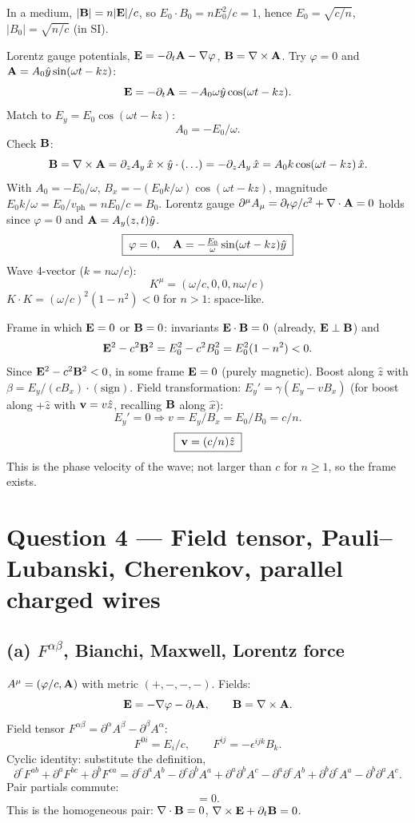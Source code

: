 \documentclass[11pt]{article}
\begin{document}
In a medium, $|\vb B| = n|\vb E|/c$, so $E_0\cdot B_0 = n E_0^2/c = 1$, hence $E_0 = \sqrt{c/n}$, $|B_0| = \sqrt{n/c}$ (in SI).

Lorentz gauge potentials, $\vb E = -\partial_t\vb A - \nabla\varphi$, $\vb B = \nabla\times\vb A$. Try $\varphi=0$ and $\vb A = A_0\hat y\sin(\omega t - kz)$:
\[ \vb E = -\partial_t\vb A = -A_0\omega\hat y\cos(\omega t - kz). \]
Match to $E_y = E_0\cos(\omega t-kz)$:
\[ A_0 = -E_0/\omega. \]
Check $\vb B$:
\[ \vb B = \nabla\times\vb A = \partial_z A_y\,\hat x \times\hat y\cdot(\ldots) = -\partial_z A_y\,\hat x = A_0 k\cos(\omega t - kz)\,\hat x. \]
With $A_0 = -E_0/\omega$, $B_x = -(E_0 k/\omega)\cos(\omega t - kz)$, magnitude $E_0 k/\omega = E_0/v_\text{ph} = n E_0/c = B_0$. Lorentz gauge $\partial^\mu A_\mu = \partial_t\varphi/c^2 + \nabla\cdot\vb A = 0$ holds since $\varphi=0$ and $\vb A = A_y(z,t)\hat y$.
\[ \boxed{\;\varphi = 0,\quad \vb A = -\tfrac{E_0}{\omega}\sin(\omega t - kz)\hat y\;} \]
Wave 4-vector ($k = n\omega/c$):
\[ \boxed{\;K^\mu = (\omega/c, 0, 0, n\omega/c)\;} \]
$K\cdot K = (\omega/c)^2(1 - n^2) < 0$ for $n>1$: space-like.

Frame in which $\vb E = 0$ or $\vb B = 0$: invariants $\vb E\cdot\vb B = 0$ (already, $\vb E\perp\vb B$) and
\[ \vb E^2 - c^2\vb B^2 = E_0^2 - c^2 B_0^2 = E_0^2(1 - n^2) < 0. \]
Since $\vb E^2 - c^2\vb B^2 < 0$, in some frame $\vb E = 0$ (purely magnetic). Boost along $\hat z$ with $\beta = E_y/(c B_x)\cdot(\text{sign})$. Field transformation: $E_y' = \gamma(E_y - v B_x)$ (for boost along $+\hat z$ with $\vb v = v\hat z$, recalling $\vb B$ along $\hat x$):
\[ E_y' = 0\Rightarrow v = E_y/B_x = E_0/B_0 = c/n. \]
\[ \boxed{\;\vb v = (c/n)\hat z\;} \]
This is the phase velocity of the wave; not larger than $c$ for $n\ge 1$, so the frame exists.

\section*{Question 4 --- Field tensor, Pauli--Lubanski, Cherenkov, parallel charged wires}

\subsection*{(a) $F^{\alpha\beta}$, Bianchi, Maxwell, Lorentz force}

$A^\mu = (\varphi/c,\vb A)$ with metric $(+,-,-,-)$. Fields:
\[ \vb E = -\nabla\varphi - \partial_t\vb A, \qquad \vb B = \nabla\times\vb A. \]
Field tensor $F^{\alpha\beta} = \partial^\alpha A^\beta - \partial^\beta A^\alpha$:
\[ F^{0i} = E_i/c,\qquad F^{ij} = -\epsilon^{ijk}B_k. \]
Cyclic identity: substitute the definition,
\[ \partial^c F^{ab} + \partial^a F^{bc} + \partial^b F^{ca} = \partial^c\partial^a A^b - \partial^c\partial^b A^a + \partial^a\partial^b A^c - \partial^a\partial^c A^b + \partial^b\partial^c A^a - \partial^b\partial^a A^c. \]
Pair partials commute:
\[ = 0. \]
This is the homogeneous pair: $\nabla\cdot\vb B = 0$, $\nabla\times\vb E + \partial_t\vb B = 0$.
\end{document}
